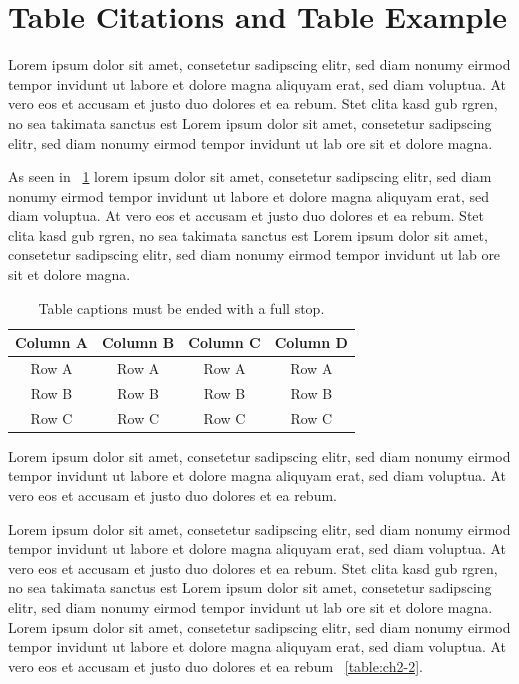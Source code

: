 \section{Table Citations and Table Example}

Lorem ipsum dolor sit amet, consetetur sadipscing elitr, sed diam nonumy eirmod tempor invidunt ut labore et dolore magna aliquyam erat, sed diam voluptua. At vero eos et accusam et justo duo dolores et ea rebum. Stet clita kasd gub rgren, no sea takimata sanctus est Lorem ipsum dolor sit amet, consetetur sadipscing elitr, sed diam nonumy eirmod tempor invidunt ut lab ore sit et dolore magna.

As seen in \tablename\ \ref{table:ch2-1} lorem ipsum dolor sit amet, consetetur sadipscing elitr, sed diam nonumy eirmod tempor invidunt ut labore et dolore magna aliquyam erat, sed diam voluptua. At vero eos et accusam et justo duo dolores et ea rebum. Stet clita kasd gub rgren, no sea takimata sanctus est Lorem ipsum dolor sit amet, consetetur sadipscing elitr, sed diam nonumy eirmod tempor invidunt ut lab ore sit et dolore magna.

\vspace{6pt} %
\begin{table}[!ht]
\centering
\setlength{\tabcolsep}{14pt}
\caption{Table captions must be ended with a full stop.}
\begin{tabular}{cccc}
\toprule\midrule
Column A & Column B & Column C & Column D \\
\midrule
Row A & Row A & Row A & Row A \\
Row B & Row B & Row B & Row B \\
Row C & Row C & Row C & Row C \\
\bottomrule
\end{tabular}
\label{table:ch2-1}
\end{table}
\vspace{-9pt} %

Lorem ipsum dolor sit amet, consetetur sadipscing elitr, sed diam nonumy eirmod tempor invidunt ut labore et dolore magna aliquyam erat, sed diam voluptua. At vero eos et accusam et justo duo dolores et ea rebum. 

Lorem ipsum dolor sit amet, consetetur sadipscing elitr, sed diam nonumy eirmod tempor invidunt ut labore et dolore magna aliquyam erat, sed diam voluptua. At vero eos et accusam et justo duo dolores et ea rebum. Stet clita kasd gub rgren, no sea takimata sanctus est Lorem ipsum dolor sit amet, consetetur sadipscing elitr, sed diam nonumy eirmod tempor invidunt ut lab ore sit et dolore magna. Lorem ipsum dolor sit amet, consetetur sadipscing elitr, sed diam nonumy eirmod tempor invidunt ut labore et dolore magna aliquyam erat, sed diam voluptua. At vero eos et accusam et justo duo dolores et ea rebum \tablename\ \ref{table:ch2-2}.

